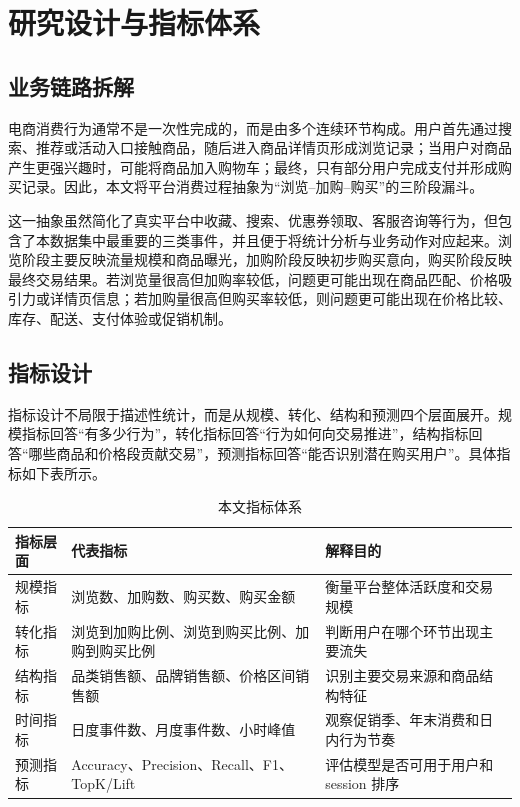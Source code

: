 \documentclass[12pt,hyperref,a4paper,UTF8]{ctexart}
\begin{document}
\section{研究设计与指标体系}

\subsection{业务链路拆解}

电商消费行为通常不是一次性完成的，而是由多个连续环节构成。用户首先通过搜索、推荐或活动入口接触商品，随后进入商品详情页形成浏览记录；当用户对商品产生更强兴趣时，可能将商品加入购物车；最终，只有部分用户完成支付并形成购买记录。因此，本文将平台消费过程抽象为“浏览--加购--购买”的三阶段漏斗。

这一抽象虽然简化了真实平台中收藏、搜索、优惠券领取、客服咨询等行为，但包含了本数据集中最重要的三类事件，并且便于将统计分析与业务动作对应起来。浏览阶段主要反映流量规模和商品曝光，加购阶段反映初步购买意向，购买阶段反映最终交易结果。若浏览量很高但加购率较低，问题更可能出现在商品匹配、价格吸引力或详情页信息；若加购量很高但购买率较低，则问题更可能出现在价格比较、库存、配送、支付体验或促销机制。

\subsection{指标设计}

指标设计不局限于描述性统计，而是从规模、转化、结构和预测四个层面展开。规模指标回答“有多少行为”，转化指标回答“行为如何向交易推进”，结构指标回答“哪些商品和价格段贡献交易”，预测指标回答“能否识别潜在购买用户”。具体指标如下表所示。

\begin{table}[H]
\centering
\caption{本文指标体系}
\begin{tabular}{p{}p{}p{}}
\toprule
指标层面 & 代表指标 & 解释目的 \\
\midrule
规模指标 & 浏览数、加购数、购买数、购买金额 & 衡量平台整体活跃度和交易规模 \\
转化指标 & 浏览到加购比例、浏览到购买比例、加购到购买比例 & 判断用户在哪个环节出现主要流失 \\
结构指标 & 品类销售额、品牌销售额、价格区间销售额 & 识别主要交易来源和商品结构特征 \\
时间指标 & 日度事件数、月度事件数、小时峰值 & 观察促销季、年末消费和日内行为节奏 \\
预测指标 & Accuracy、Precision、Recall、F1、TopK/Lift & 评估模型是否可用于用户和 session 排序 \\
\bottomrule
\end{tabular}
\end{table}
\end{document}

